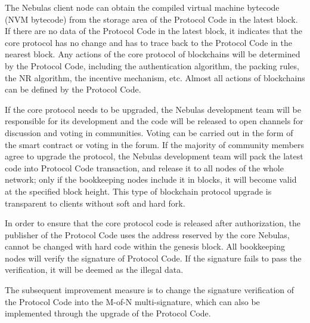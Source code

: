 The Nebulas client node can obtain the compiled virtual machine bytecode (NVM bytecode) from the storage area of the Protocol Code in the latest block. If there are no data of the Protocol Code in the latest block, it indicates that the core protocol has no change and has to trace back to the Protocol Code in the nearest block. Any actions of the core protocol of blockchains will be determined by the Protocol Code, including the authentication algorithm, the packing rules, the NR algorithm, the incentive mechanism, etc. Almost all actions of blockchains can be defined by the Protocol Code.

If the core protocol needs to be upgraded, the Nebulas development team will be responsible for its development and the code will be released to open channels for discussion and voting in communities. Voting can be carried out in the form of the smart contract or voting in the forum. If the majority of community members agree to upgrade the protocol, the Nebulas development team will pack the latest code into Protocol Code transaction, and release it to all nodes of the whole network; only if the bookkeeping nodes include it in blocks, it will become valid at the specified block height. This type of blockchain protocol upgrade is transparent to clients without soft and hard fork.



In order to ensure that the core protocol code is released after authorization, the publisher of the Protocol Code uses the address reserved by the core Nebulas, cannot be changed with hard code within the genesis block. All bookkeeping nodes will verify the signature of Protocol Code. If the signature fails to pass the verification, it will be deemed as the illegal data.


The subsequent improvement measure is to change the signature verification of the Protocol Code into the M-of-N multi-signature, which can also be implemented through the upgrade of the Protocol Code.

